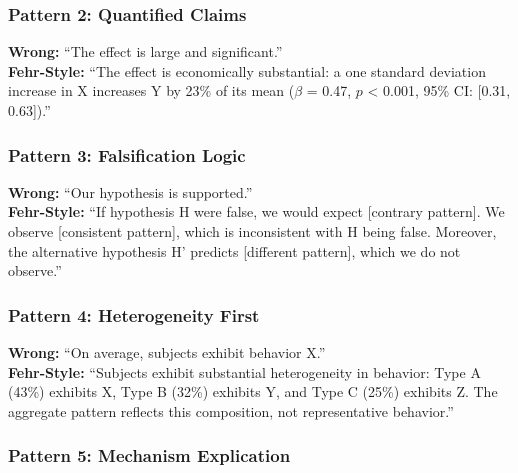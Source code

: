 \subsubsection{Pattern 2: Quantified Claims}

\begin{tcolorbox}[colback=gray!5!white, colframe=gray!75!black]
\textbf{Wrong:} ``The effect is large and significant.'' \\[0.5em]
\textbf{Fehr-Style:} ``The effect is economically substantial: a one
standard deviation increase in X increases Y by 23\% of its mean
($\beta$ = 0.47, $p$ < 0.001, 95\% CI: [0.31, 0.63]).''
\end{tcolorbox}

\subsubsection{Pattern 3: Falsification Logic}

\begin{tcolorbox}[colback=gray!5!white, colframe=gray!75!black]
\textbf{Wrong:} ``Our hypothesis is supported.'' \\[0.5em]
\textbf{Fehr-Style:} ``If hypothesis H were false, we would expect
[contrary pattern]. We observe [consistent pattern], which is
inconsistent with H being false. Moreover, the alternative hypothesis
H' predicts [different pattern], which we do not observe.''
\end{tcolorbox}

\subsubsection{Pattern 4: Heterogeneity First}

\begin{tcolorbox}[colback=gray!5!white, colframe=gray!75!black]
\textbf{Wrong:} ``On average, subjects exhibit behavior X.'' \\[0.5em]
\textbf{Fehr-Style:} ``Subjects exhibit substantial heterogeneity in
behavior: Type A (43\%) exhibits X, Type B (32\%) exhibits Y, and
Type C (25\%) exhibits Z. The aggregate pattern reflects this
composition, not representative behavior.''
\end{tcolorbox}

\subsubsection{Pattern 5: Mechanism Explication}

